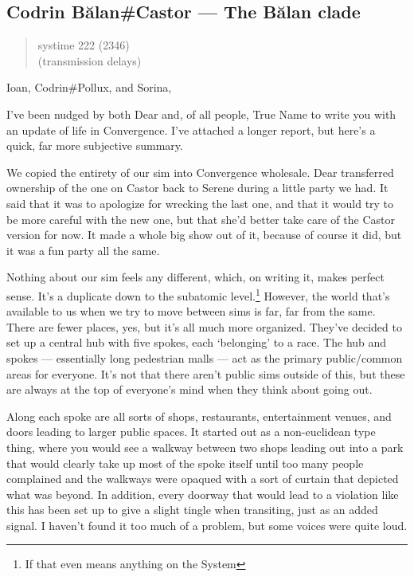 \hypertarget{codrin-bux103lancastor-the-bux103lan-clade}{%
\subsection{Codrin Bălan\#Castor — The Bălan clade}\label{codrin-bux103lancastor-the-bux103lan-clade}}

\begin{quote}
systime 222 (2346)\\
(transmission delays)
\end{quote}

Ioan, Codrin\#Pollux, and Sorina,

I've been nudged by both Dear and, of all people, True Name to write you with an update of life in Convergence. I've attached a longer report, but here's a quick, far more subjective summary.

We copied the entirety of our sim into Convergence wholesale. Dear transferred ownership of the one on Castor back to Serene during a little party we had. It said that it was to apologize for wrecking the last one, and that it would try to be more careful with the new one, but that she'd better take care of the Castor version for now. It made a whole big show out of it, because of course it did, but it was a fun party all the same.

Nothing about our sim feels any different, which, on writing it, makes perfect sense. It's a duplicate down to the subatomic level.\footnote{If that even means anything on the System} However, the world that's available to us when we try to move between sims is far, far from the same. There are fewer places, yes, but it's all much more organized. They've decided to set up a central hub with five spokes, each `belonging' to a race. The hub and spokes — essentially long pedestrian malls — act as the primary public/common areas for everyone. It's not that there aren't public sims outside of this, but these are always at the top of everyone's mind when they think about going out.

Along each spoke are all sorts of shops, restaurants, entertainment venues, and doors leading to larger public spaces. It started out as a non-euclidean type thing, where you would see a walkway between two shops leading out into a park that would clearly take up most of the spoke itself until too many people complained and the walkways were opaqued with a sort of curtain that depicted what was beyond. In addition, every doorway that would lead to a violation like this has been set up to give a slight tingle when transiting, just as an added signal. I haven't found it too much of a problem, but some voices were quite loud.

